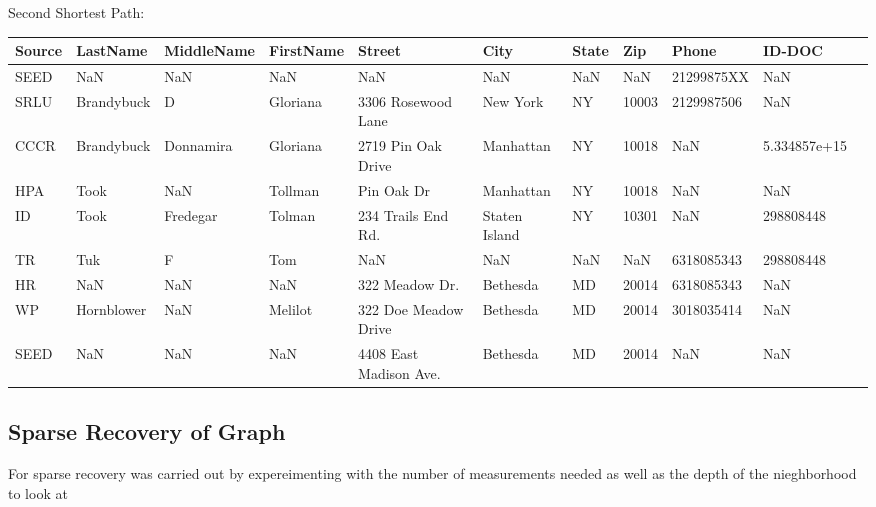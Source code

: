 \documentclass{article} %
\begin{document}
Second Shortest Path:
\begin{table}[h]
\centering
\tiny
\begin{tabular}{|l|l|l|l|l|l|l|l|l|l|l|}
\hline
\textbf{Source}  & \textbf{LastName} & \textbf{MiddleName} & \textbf{FirstName} & \textbf{Street} & \textbf{City} & \textbf{State} & \textbf{Zip} & \textbf{Phone} & \textbf{ID-DOC} \\ \hline


SEED&        NaN&        NaN&    NaN&   NaN&  NaN&   NaN&  NaN&   21299875XX&     NaN \\ \hline
   SRLU&  Brandybuck&   D&  Gloriana&  3306 Rosewood Lane&  New York&  NY&  10003&   2129987506&     NaN  \\ \hline
   CCCR&   Brandybuck&  Donnamira&   Gloriana&  2719 Pin Oak Drive&  Manhattan&    NY&  10018&   NaN&  5.334857e+15      \\ \hline
  HPA&    Took&        NaN&   Tollman&  Pin Oak Dr& Manhattan&    NY&  10018&   NaN&     NaN     \\ \hline
    ID&    Took&   Fredegar&   Tolman&  234 Trails End Rd.&  Staten Island&    NY&  10301&   NaN&   298808448 \\ \hline
   TR&       Tuk&          F&     Tom&    NaN&  NaN&   NaN&  NaN&  6318085343&  298808448  \\ \hline
   HR&        NaN&        NaN&    NaN&  322 Meadow Dr.&  Bethesda&    MD&  20014&  6318085343&     NaN  \\ \hline
   WP&  Hornblower&        NaN&    Melilot&  322 Doe Meadow Drive&  Bethesda&    MD&  20014&  3018035414&    NaN  \\ \hline
   SEED&     NaN&        NaN&       NaN&  4408 East Madison Ave.&    Bethesda&    MD&  20014&   NaN&     NaN  \\ \hline
\end{tabular}
\end{table}

\newpage
\subsection{Sparse Recovery of Graph}

For sparse recovery was carried out by expereimenting with the number of measurements needed as well as the depth of the nieghborhood to look at 
\end{document}
